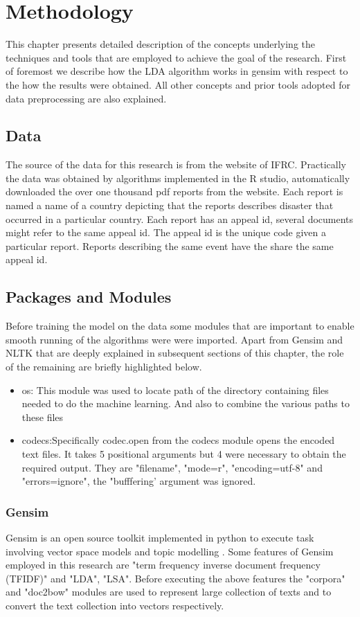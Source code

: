 \chapter{Methodology}
This chapter presents detailed description  of the concepts underlying the techniques and tools that are employed to achieve the goal of the research. First of foremost we describe how the LDA algorithm works in gensim with respect to the how the results were obtained. All other concepts and prior tools adopted for data preprocessing are also explained.

\section{Data}
The source of the data for this research is from the website of IFRC. Practically the data was obtained by algorithms implemented in the R studio, automatically downloaded the over one thousand pdf reports from the website. Each report is named a name of a country depicting that the reports describes disaster that occurred in a particular country. Each report has an appeal id, several documents might refer to the same appeal id. The appeal id is the unique code given a particular report. Reports describing the same event have the share the same appeal id.

\section{Packages and Modules}
Before training the model on the data some modules that are important to enable smooth running of the algorithms were were imported. Apart from Gensim and NLTK that are deeply explained in subsequent sections of this chapter, the role of  the remaining are briefly highlighted below.
\begin{itemize}
\item os: This module was used to locate path of the directory containing files needed to do the machine learning. And also to combine the various paths to these files
\item codecs:Specifically codec.open from the codecs module opens  the encoded text files. It takes 5 positional arguments but 4 were necessary to obtain the required output. They are "filename", "mode=r", "encoding=utf-8" and "errors=ignore", the "bufffering' argument was ignored.
\end{itemize} 

\subsection{Gensim}
\begin{flushleft}
Gensim is an open source toolkit implemented in python to execute task involving vector space models and topic modelling \cite{rehurek2010software}. Some features of Gensim employed in this research are "term frequency inverse document frequency (TFIDF)" and "LDA", "LSA". Before executing the above features the "corpora" and "doc2bow" modules are used to represent large collection of texts and to convert the text collection into vectors respectively.
\end{flushleft}
